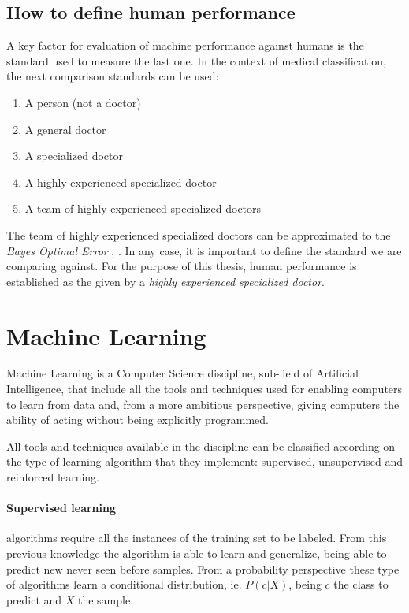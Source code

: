 \subsection{How to define human performance}

A key factor for evaluation of machine performance against humans is the standard used to measure the last one. In the context of medical classification, the next comparison standards can be used:

\begin{enumerate}
\item A person (not a doctor)
\item A general doctor
\item A specialized doctor
\item A highly experienced specialized doctor
\item A team of highly experienced specialized doctors
\end{enumerate}

The team of highly experienced specialized doctors can be approximated to the \emph{Bayes Optimal Error} \citep{fukunaga2013introduction}, \citep{tumer1996estimating}. In any case, it is important to define the standard we are comparing against. For the purpose of this thesis, human performance is established as the given by a \emph{highly experienced specialized doctor}.

\section{Machine Learning}

Machine Learning is a Computer Science discipline, sub-field of Artificial Intelligence, that include all the tools and techniques used for enabling computers to learn from data and, from a more ambitious perspective, giving computers the ability of acting without being explicitly programmed.  

All tools and techniques available in the discipline can be classified according on the type of learning algorithm that they implement: supervised, unsupervised and reinforced learning.

\paragraph{Supervised learning} algorithms require all the instances of the training set to be labeled. From this previous knowledge the algorithm is able to learn and generalize, being able to predict new never seen before samples. From a probability perspective these type of algorithms learn a conditional distribution, ie. $P(c|X)$, being $c$ the class to predict and $X$ the sample.

